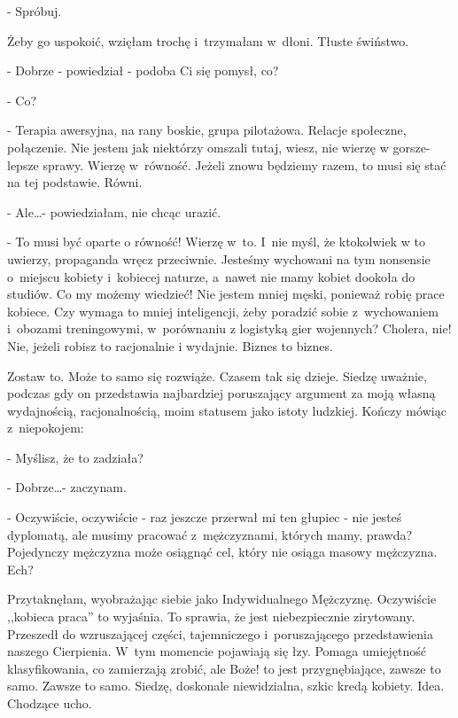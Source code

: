 \documentclass[oneside,polish,12pt,sfheadings]{mwbk}
\begin{document}
- Spróbuj.

Żeby go uspokoić, wzięłam trochę i~trzymałam w~dłoni. Tłuste świństwo.

- Dobrze - powiedział - podoba Ci się pomysł, co?

- Co?

- Terapia awersyjna, na rany boskie, grupa pilotażowa. Relacje społeczne,
połączenie. Nie jestem jak niektórzy omszali tutaj, wiesz, nie wierzę
w gorsze-lepsze sprawy. Wierzę w~równość. Jeżeli znowu będziemy razem,
to musi się stać na tej podstawie. Równi.

- Ale\ldots - powiedziałam, nie chcąc urazić.

- To musi być oparte o równość! Wierzę w~to. I~nie myśl, że ktokolwiek
w to uwierzy, propaganda wręcz przeciwnie. Jesteśmy wychowani na tym
nonsensie o~miejscu kobiety i~kobiecej naturze, a~nawet nie mamy kobiet
dookoła do studiów. Co my możemy wiedzieć! Nie jestem mniej męski,
ponieważ robię prace kobiece. Czy wymaga to mniej inteligencji, żeby
poradzić sobie z~wychowaniem i~obozami treningowymi, w~porównaniu
z logistyką gier wojennych? Cholera, nie! Nie, jeżeli robisz to racjonalnie
i wydajnie. Biznes to biznes.

Zostaw to. Może to samo się rozwiąże. Czasem tak się dzieje. Siedzę
uważnie, podczas gdy on przedstawia najbardziej poruszający argument
za moją własną wydajnością, racjonalnością, moim statusem jako istoty
ludzkiej. Kończy mówiąc z~niepokojem: 

- Myślisz, że to zadziała?

- Dobrze\ldots - zaczynam.

- Oczywiście, oczywiście - raz jeszcze przerwał mi ten głupiec - nie
jesteś dyplomatą, ale musimy pracować z~mężczyznami, których mamy,
prawda? Pojedynczy mężczyzna może osiągnąć cel, który nie osiąga masowy
mężczyzna. Ech?

Przytaknęłam, wyobrażając siebie jako Indywidualnego Mężczyznę. Oczywiście
,,kobieca praca'' to wyjaśnia. To sprawia, że jest niebezpiecznie
zirytowany. Przeszedł do wzruszającej części, tajemniczego i~poruszającego
przedstawienia naszego Cierpienia. W~tym momencie pojawiają się łzy.
Pomaga umiejętność klasyfikowania, co zamierzają zrobić, ale Boże!
to jest przygnębiające, zawsze to samo. Zawsze to samo. Siedzę, doskonale
niewidzialna, szkic kredą kobiety. Idea. Chodzące ucho.
\end{document}
